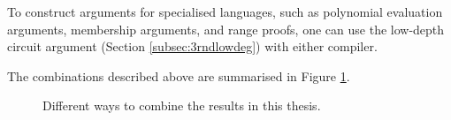 To construct arguments for specialised languages, such as polynomial evaluation arguments, membership arguments, and range proofs, one can use the low-depth circuit argument (Section \ref{subsec:3rndlowdeg}) with either compiler.

The combinations described above are summarised in Figure \ref{fig:recipes}.

\begin{figure}[htb]
\caption{Different ways to combine the results in this thesis.}\label{fig:recipes}
\end{figure}